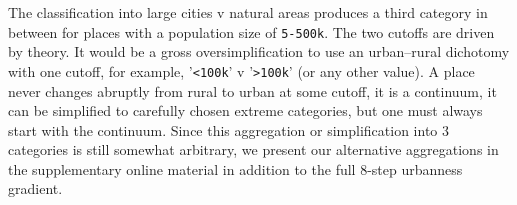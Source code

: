 \documentclass[11pt, letterpaper]{article}
\begin{document}
The classification into 
large cities v natural areas produces a third category in between for places with a population size of \texttt{5-500k}.
%
The two cutoffs are driven by theory. It would be a gross oversimplification to use
an urban--rural dichotomy with one cutoff, for example, '\texttt{<100k}' v '\texttt{>100k}' (or any other value). A place never changes abruptly from rural to urban at some cutoff, it is a continuum, it can be simplified to carefully chosen extreme categories, but one must always start with the continuum.
%
Since this aggregation or simplification into 3 categories is still
somewhat arbitrary, we present our alternative aggregations in the supplementary
online material in addition to the full 8-step urbanness gradient. 



\end{document}
